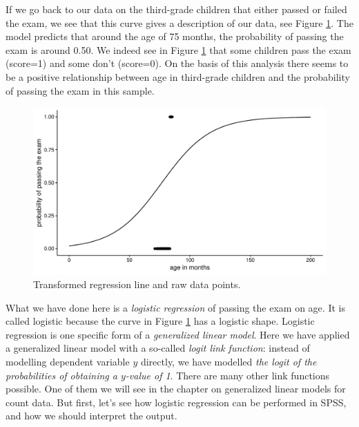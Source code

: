 \documentclass[]{book}\usepackage[]{graphicx}\usepackage[]{color}
\makeatletter
\def\maxwidth{ %
  \ifdim\Gin@nat@width>\linewidth
    \linewidth
  \else
    \Gin@nat@width
  \fi
}
\newenvironment{knitrout}{}{} %
\makeatother
\begin{document}
If we go back to our data on the third-grade children that either passed or failed the exam, we see that this curve gives a description of our data, see Figure \ref{fig:gen_11}. The model predicts that around the age of 75 months, the probability of passing the exam is around 0.50. We indeed see in Figure \ref{fig:gen_11} that some children pass the exam (score=1) and some don't (score=0). On the basis of this analysis there seems to be a positive relationship between age in third-grade children and the probability of passing the exam in this sample.

\begin{knitrout}
\color{fgcolor}\begin{figure}

{\centering \includegraphics[width=\maxwidth]{figure/gen_11-1} 

}

\caption[Transformed regression line and raw data points]{Transformed regression line and raw data points.}\label{fig:gen_11}
\end{figure}


\end{knitrout}

What we have done here is a \textit{logistic regression} of passing the exam on age. It is called logistic because the curve in Figure \ref{fig:gen_11} has a logistic shape. Logistic regression is one specific form of a \textit{generalized linear model}. Here we have applied a generalized linear model with a so-called \textit{logit link function}: instead of modelling dependent variable $y$ directly, we have modelled \textit{the logit of the probabilities of obtaining a $y$-value of 1}. There are many other link functions possible. One of them we will see in the chapter on generalized linear models for count data. But first, let's see how logistic regression can be performed in SPSS, and how we should interpret the output.
\end{document}
